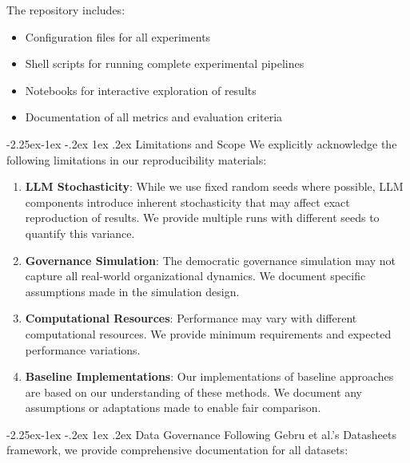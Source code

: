 \documentclass[manuscript,screen,review,anonymous,9pt]{acmart}
\makeatletter
\renewcommand\subsection{\@startsection{subsection}{2}{\z@}%
  {-2.25ex\@plus -1ex \@minus -.2ex}%
  {1ex \@plus .2ex}%
  {\normalfont\large\bfseries}}
\makeatother
\begin{document}
The repository includes:
\begin{itemize}
    \item Configuration files for all experiments
    \item Shell scripts for running complete experimental pipelines
    \item Notebooks for interactive exploration of results
    \item Documentation of all metrics and evaluation criteria
\end{itemize}

\subsection{Limitations and Scope}
We explicitly acknowledge the following limitations in our reproducibility materials:

\begin{enumerate}
    \item \textbf{LLM Stochasticity}: While we use fixed random seeds where possible, LLM components introduce inherent stochasticity that may affect exact reproduction of results. We provide multiple runs with different seeds to quantify this variance.
    
    \item \textbf{Governance Simulation}: The democratic governance simulation may not capture all real-world organizational dynamics. We document specific assumptions made in the simulation design.
    
    \item \textbf{Computational Resources}: Performance may vary with different computational resources. We provide minimum requirements and expected performance variations.
    
    \item \textbf{Baseline Implementations}: Our implementations of baseline approaches are based on our understanding of these methods. We document any assumptions or adaptations made to enable fair comparison.
\end{enumerate}

\subsection{Data Governance}
Following Gebru et al.'s Datasheets framework, we provide comprehensive documentation for all datasets:
\end{document}
